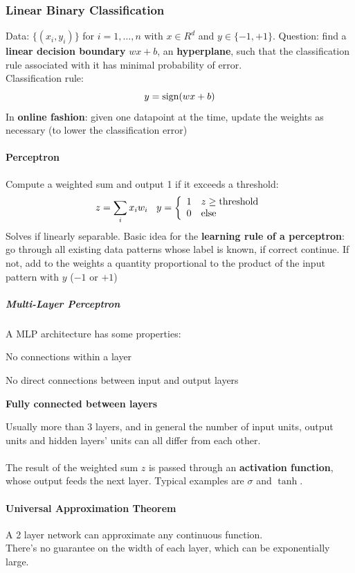 \documentclass[10pt]{report}
\begin{document}
\subsubsection{Linear Binary Classification}
Data: $\{(x_i,y_i)\}$ for $i=1,\ldots,n$ with $x \in R^d$ and $y \in \{-1,+1\}$. Question: find a \textbf{linear decision boundary} $wx + b$, an \textbf{hyperplane}, such that the classification rule associated with it has minimal probability of error.\\
Classification rule: $$y = \hbox{sign}(wx+b)$$
In \textbf{online fashion}: given one datapoint at the time, update the weights as necessary (to lower the classification error)
\paragraph{Perceptron} Compute a weighted sum and output 1 if it exceeds a threshold:
$$z=\sum_i x_iw_i \:\:\:\: y = \left\{ \begin{array}{l l}
1 & z\geq\hbox{threshold}\\
0 & \hbox{else}
\end{array} \right.$$
Solves if linearly separable. Basic idea for the \textbf{learning rule of a perceptron}: go through all existing data patterns whose label is known, if correct continue. If not, add to the weights a quantity proportional to the product of the input pattern with $y$ ($-1$ or $+1$)
\subparagraph{Multi-Layer Perceptron} A MLP architecture has some properties:
\begin{list}{}{}
	\item No connections within a layer
	\item No direct connections between input and output layers
	\item \textbf{Fully connected between layers}
\end{list}
Usually more than 3 layers, and in general the number of input units, output units and hidden layers' units can all differ from each other.\\\\
The result of the weighted sum $z$ is passed through an \textbf{activation function}, whose output feeds the next layer. Typical examples are $\sigma$ and $\tanh$.
\paragraph{Universal Approximation Theorem} A 2 layer network can approximate any continuous function.\\
There's no guarantee on the width of each layer, which can be exponentially large.
\end{document}
